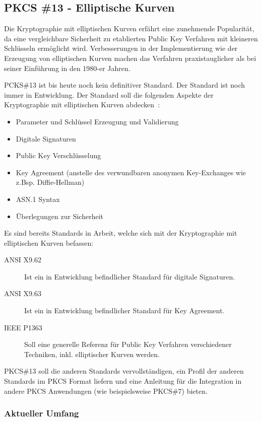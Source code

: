 \documentclass[10pt,a4paper]{article}
\begin{document}
\subsection{PKCS \#13 - Elliptische Kurven}

Die Kryptographie mit elliptischen Kurven erfährt eine zunehmende Popularität, da eine
vergleichbare Sicherheit zu etablierten Public Key Verfahren mit kleineren Schlüsseln
ermöglicht wird. Verbesserungen in der Implementierung wie der Erzeugung von elliptischen
Kurven machen das Verfahren praxistauglicher als bei seiner Einführung in den 1980-er
Jahren.

PCKS\#13 ist bis heute noch kein definitiver Standard. Der Standard ist noch immer in
Entwicklung. Der Standard soll die folgenden Aspekte der Kryptographie mit elliptischen
Kurven abdecken~\cite{pkcs13-proj}:

\begin{itemize}
    \item Parameter und Schlüssel Erzeugung und Validierung
    \item Digitale Signaturen
    \item Public Key Verschlüsselung
    \item Key Agreement (anstelle des verwundbaren anonymen Key-Exchanges wie z.Bsp.
        Diffie-Hellman)
    \item ASN.1 Syntax
    \item Überlegungen zur Sicherheit
\end{itemize}

Es sind bereits Standards in Arbeit, welche sich mit der Kryptographie mit elliptischen
Kurven befassen:
\begin{description}
    \item[ANSI X9.62] Ist ein in Entwicklung befindlicher Standard für digitale
        Signaturen.
    \item[ANSI X9.63 ] Ist ein in Entwicklung befindlicher Standard für Key Agreement.
    \item[IEEE P1363] Soll eine generelle Referenz für Public Key Verfahren verschiedener
        Techniken, inkl. elliptischer Kurven werden.
\end{description}

PKCS\#13 soll die anderen Standards vervollständigen, ein Profil der anderen Standards im
PKCS Format liefern und eine Anleitung für die Integration in andere PKCS Anwendungen (wie
beispielsweise PKCS\#7) bieten.

\subsubsection{Aktueller Umfang}
\end{document}
